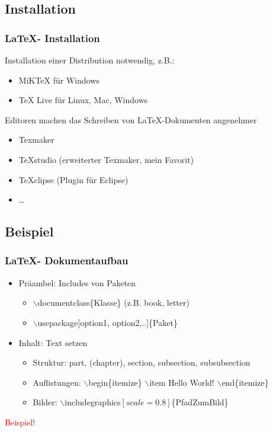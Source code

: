 \documentclass[18pt]{beamer}
\begin{document}
	\subsection{Installation}
	\begin{frame}
		\frametitle{\LaTeX - Installation}
		Installation einer Distribution notwendig, z.B.:
		\begin{itemize}
			\item  MiKTeX für Windows
			\item TeX Live für Linux, Mac, Windows
		\end{itemize}
		\pause
		Editoren machen das Schreiben von \LaTeX -Dokumenten angenehmer
		\begin{itemize}
			\item Texmaker
			\item TeXstudio (erweiterter Texmaker, mein Favorit)
			\item TeXclipse (Plugin für Eclipse)
			\item \dots
		\end{itemize}
	\end{frame}
	
	\subsection{Beispiel}
	\begin{frame}
		\frametitle{\LaTeX - Dokumentaufbau}
		\begin{itemize}
			\item Präambel: Includes von Paketen
			\begin{itemize}
				\item $\backslash$documentclass\{Klasse\} (z.B. book, letter)
				\item $\backslash$usepackage[option1, option2,..]\{Paket\}
			\end{itemize}
			\pause
			\item Inhalt: Text setzen 
			\begin{itemize}
				\item Struktur: part, (chapter), section, subsection, subsubsection
				\item Auflistungen: $\backslash$begin\{itemize\} $\backslash$item Hello World! $\backslash$end\{itemize\}
				\item Bilder: $\backslash$includegraphics$[scale=0.8]$\{PfadZumBild\}
			\end{itemize}
			\pause
		\end{itemize}
		\huge \centering \textcolor{red}{Beispiel!}
	\end{frame}
		
\end{document}
